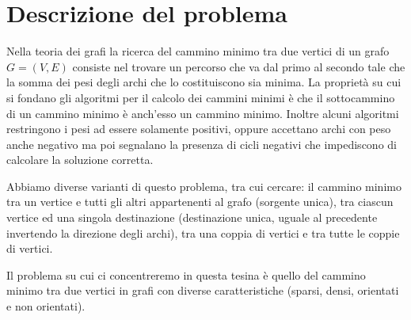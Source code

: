 \documentclass[12pt,a4paper]{report}
\begin{document}
\chapter{Descrizione del problema}\label{ch:des-pro}
Nella teoria dei grafi la ricerca del cammino minimo tra due vertici di un grafo \(G = (V, E)\) consiste nel trovare un percorso che va dal primo al secondo tale che la somma dei pesi degli archi che lo costituiscono sia minima.
La proprietà su cui si fondano gli algoritmi per il calcolo dei cammini minimi è che il sottocammino di un cammino minimo è anch'esso un cammino minimo.
Inoltre alcuni algoritmi restringono i pesi ad essere solamente positivi, oppure accettano archi con peso anche negativo ma poi segnalano la presenza di cicli negativi che impediscono di calcolare la soluzione corretta.

Abbiamo diverse varianti di questo problema, tra cui cercare: il cammino minimo tra un vertice e tutti gli altri appartenenti al grafo (sorgente unica), tra ciascun vertice ed una singola destinazione (destinazione unica, uguale al precedente invertendo la direzione degli archi), tra una coppia di vertici e tra tutte le coppie di vertici.

Il problema su cui ci concentreremo in questa tesina è quello del cammino minimo tra due vertici in grafi con diverse caratteristiche (sparsi, densi, orientati e non orientati).

\end{document}
